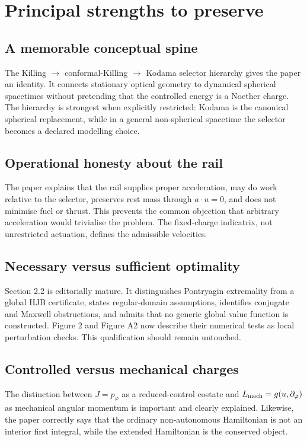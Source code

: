 \documentclass[11pt,a4paper]{article}
\begin{document}
\clearpage
\section{Principal strengths to preserve}

\subsection{A memorable conceptual spine}

The Killing $\rightarrow$ conformal-Killing $\rightarrow$ Kodama selector hierarchy gives the
paper an identity. It connects stationary optical geometry to dynamical spherical spacetimes
without pretending that the controlled energy is a Noether charge. The hierarchy is strongest
when explicitly restricted: Kodama is the canonical spherical replacement, while in a general
non-spherical spacetime the selector becomes a declared modelling choice.

\subsection{Operational honesty about the rail}

The paper explains that the rail supplies proper acceleration, may do work relative to the
selector, preserves rest mass through $a\!\cdot\!u=0$, and does not minimise fuel or thrust.
This prevents the common objection that arbitrary acceleration would trivialise the problem.
The fixed-charge indicatrix, not unrestricted actuation, defines the admissible velocities.

\subsection{Necessary versus sufficient optimality}

Section 2.2 is editorially mature. It distinguishes Pontryagin extremality from a global HJB
certificate, states regular-domain assumptions, identifies conjugate and Maxwell obstructions,
and admits that no generic global value function is constructed. Figure 2 and Figure A2 now
describe their numerical tests as local perturbation checks. This qualification should remain
untouched.

\subsection{Controlled versus mechanical charges}

The distinction between $J=p_\varphi$ as a reduced-control costate and
$L_{\rm mech}=g(u,\partial_\varphi)$ as mechanical angular momentum is important and clearly
explained. Likewise, the paper correctly says that the ordinary non-autonomous Hamiltonian is
not an interior first integral, while the extended Hamiltonian is the conserved object.
\end{document}
